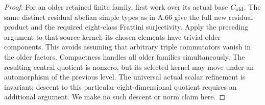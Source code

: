 \begin{proof}
For an older retained finite family, first work over its actual
base \(C_{\rm old}\). The same distinct residual abelian simple
types as in A.66 give the full new residual product and the
required eight-class Frattini surjectivity. Apply the preceding
argument to that source kernel; its chosen elements have trivial
older components. This avoids assuming that arbitrary triple
commutators vanish in the older factors. Compactness handles
all older families simultaneously.
The resulting central quotient is nonzero, but its selected
kernel may move under an automorphism of the previous level.
The universal actual scalar refinement is invariant; descent
to this particular eight-dimensional quotient requires an
additional argument. We make no such descent or norm claim here.
\end{proof}
